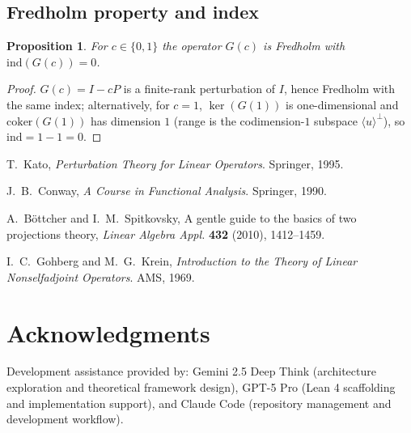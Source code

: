 \documentclass[11pt]{article}
\newtheorem{proposition}[theorem]{Proposition}
\theoremstyle{definition}
\DeclareMathOperator{\kerop}{ker}
\begin{document}
\subsection{Fredholm property and index}

\begin{proposition}\label{prop:fredholm}
For $c\in\{0,1\}$ the operator $G(c)$ is Fredholm with $\mathrm{ind}(G(c))=0$.
\end{proposition}

\begin{proof}
$G(c)=I-cP$ is a finite-rank perturbation of $I$, hence Fredholm with the same index; alternatively, for $c=1$, $\kerop(G(1))$ is one-dimensional and $\mathrm{coker}(G(1))$ has dimension $1$ (range is the codimension-$1$ subspace $\langle u\rangle^\perp$), so $\mathrm{ind}=1-1=0$.
\end{proof}

\begin{thebibliography}{9}

T.~Kato, \emph{Perturbation Theory for Linear Operators}. Springer, 1995.

J.~B.~Conway, \emph{A Course in Functional Analysis}. Springer, 1990.

A.~B\"{o}ttcher and I.~M.~Spitkovsky, A gentle guide to the basics of two projections theory,
\emph{Linear Algebra Appl.} \textbf{432} (2010), 1412--1459.

I.~C.~Gohberg and M.~G.~Krein, \emph{Introduction to the Theory of Linear Nonselfadjoint Operators}. AMS, 1969.

\end{thebibliography}

\section*{Acknowledgments}
Development assistance provided by: Gemini 2.5 Deep Think (architecture exploration and theoretical framework design), GPT-5 Pro (Lean 4 scaffolding and implementation support), and Claude Code (repository management and development workflow).
\end{document}
